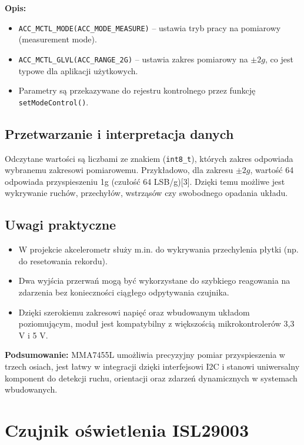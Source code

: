 \documentclass[a4paper,12pt]{report}
\begin{document}
\textbf{Opis:}
\begin{itemize}
    \item \texttt{ACC\_MCTL\_MODE(ACC\_MODE\_MEASURE)} – ustawia tryb pracy na pomiarowy (measurement mode).
    \item \texttt{ACC\_MCTL\_GLVL(ACC\_RANGE\_2G)} – ustawia zakres pomiarowy na \(\pm2g\), co jest typowe dla aplikacji użytkowych.
    \item Parametry są przekazywane do rejestru kontrolnego przez funkcję \texttt{setModeControl()}.
\end{itemize}

\subsection*{Przetwarzanie i interpretacja danych}

Odczytane wartości są liczbami ze znakiem (\texttt{int8\_t}), których zakres odpowiada wybranemu zakresowi pomiarowemu. Przykładowo, dla zakresu \(\pm2g\), wartość 64 odpowiada przyspieszeniu 1g (czułość 64 LSB/g)[3]. Dzięki temu możliwe jest wykrywanie ruchów, przechyłów, wstrząsów czy swobodnego opadania układu.

\subsection*{Uwagi praktyczne}

\begin{itemize}
    \item W projekcie akcelerometr służy m.in. do wykrywania przechylenia płytki (np. do resetowania rekordu).
    \item Dwa wyjścia przerwań mogą być wykorzystane do szybkiego reagowania na zdarzenia bez konieczności ciągłego odpytywania czujnika.
    \item Dzięki szerokiemu zakresowi napięć oraz wbudowanym układom poziomującym, moduł jest kompatybilny z większością mikrokontrolerów 3,3 V i 5 V.
\end{itemize}

\textbf{Podsumowanie:}  
MMA7455L umożliwia precyzyjny pomiar przyspieszenia w trzech osiach, jest łatwy w integracji dzięki interfejsowi I2C i stanowi uniwersalny komponent do detekcji ruchu, orientacji oraz zdarzeń dynamicznych w systemach wbudowanych.

\section{Czujnik oświetlenia ISL29003}
\end{document}
